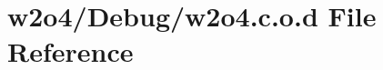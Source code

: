 \hypertarget{w2o4_8c_8o_8d}{}\section{w2o4/\+Debug/w2o4.c.\+o.\+d File Reference}
\label{w2o4_8c_8o_8d}
